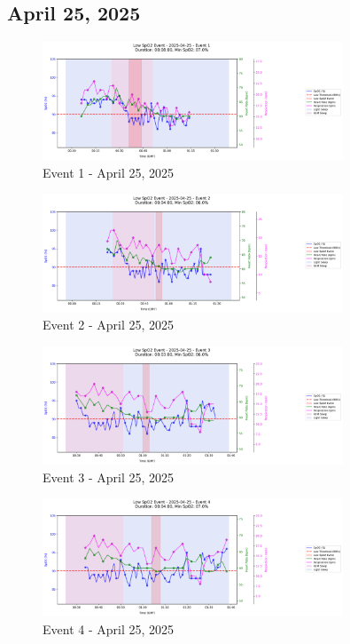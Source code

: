 \documentclass{article}
\begin{document}
\subsection{April 25, 2025}
\begin{figure}[htbp]
    \centering
    \includegraphics[width=0.8\textwidth]{images/2025-04-25_event_1.png}
    \caption{Event 1 - April 25, 2025}
\end{figure}
\begin{figure}[htbp]
    \centering
    \includegraphics[width=0.8\textwidth]{images/2025-04-25_event_2.png}
    \caption{Event 2 - April 25, 2025}
\end{figure}
\begin{figure}[htbp]
    \centering
    \includegraphics[width=0.8\textwidth]{images/2025-04-25_event_3.png}
    \caption{Event 3 - April 25, 2025}
\end{figure}
\begin{figure}[htbp]
    \centering
    \includegraphics[width=0.8\textwidth]{images/2025-04-25_event_4.png}
    \caption{Event 4 - April 25, 2025}
\end{figure}
\end{document}
